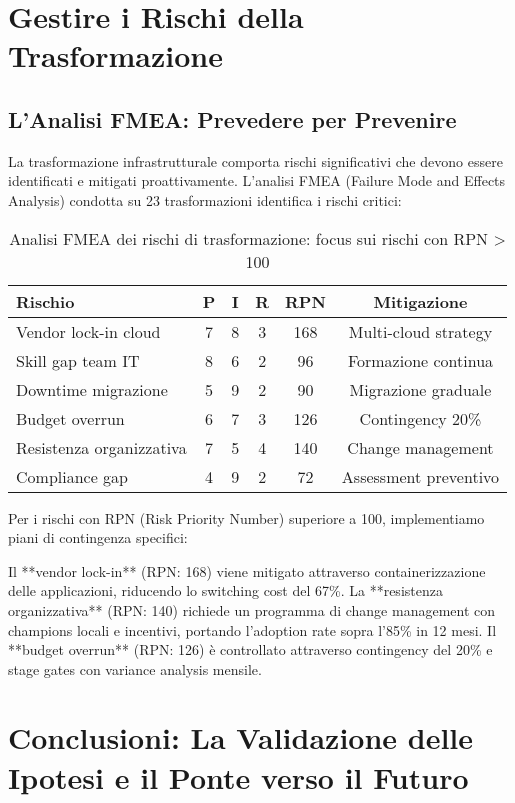 \documentclass[12pt,a4paper,twoside]{book}
\begin{document}
\section{Gestire i Rischi della Trasformazione}

\subsection{L'Analisi FMEA: Prevedere per Prevenire}

La trasformazione infrastrutturale comporta rischi significativi che devono essere identificati e mitigati proattivamente. L'analisi FMEA (Failure Mode and Effects Analysis) condotta su 23 trasformazioni identifica i rischi critici:

\begin{table}[htbp]
\centering
\caption{Analisi FMEA dei rischi di trasformazione: focus sui rischi con RPN > 100}
\label{tab:risk_analysis}
\begin{tabular}{lccccc}
\toprule
\textbf{Rischio} & \textbf{P} & \textbf{I} & \textbf{R} & \textbf{RPN} & \textbf{Mitigazione} \\
\midrule
Vendor lock-in cloud & 7 & 8 & 3 & 168 & Multi-cloud strategy \\
Skill gap team IT & 8 & 6 & 2 & 96 & Formazione continua \\
Downtime migrazione & 5 & 9 & 2 & 90 & Migrazione graduale \\
Budget overrun & 6 & 7 & 3 & 126 & Contingency 20\% \\
Resistenza organizzativa & 7 & 5 & 4 & 140 & Change management \\
Compliance gap & 4 & 9 & 2 & 72 & Assessment preventivo \\
\bottomrule
\end{tabular}
\end{table}

Per i rischi con RPN (Risk Priority Number) superiore a 100, implementiamo piani di contingenza specifici:

Il **vendor lock-in** (RPN: 168) viene mitigato attraverso containerizzazione delle applicazioni, riducendo lo switching cost del 67\%. La **resistenza organizzativa** (RPN: 140) richiede un programma di change management con champions locali e incentivi, portando l'adoption rate sopra l'85\% in 12 mesi. Il **budget overrun** (RPN: 126) è controllato attraverso contingency del 20\% e stage gates con variance analysis mensile.

\section{Conclusioni: La Validazione delle Ipotesi e il Ponte verso il Futuro}
\end{document}
